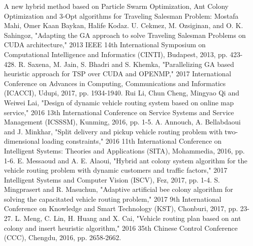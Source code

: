 \documentclass[conference]{IEEEtran}
\begin{document}
\begin{thebibliography}{00}
 A new hybrid method based on Particle Swarm Optimization, Ant Colony Optimization and 3-Opt algorithms for Traveling Salesman Problem: Mostafa Mahi, Omer Kaan Baykan, Halife Kodaz.
 U. Cekmez, M. Ozsiginan, and O. K. Sahingoz, "Adapting the GA approach to solve Traveling Salesman Problems on CUDA architecture," 2013 IEEE 14th International Symposium on Computational Intelligence and Informatics (CINTI), Budapest, 2013, pp. 423-428.
 R. Saxena, M. Jain, S. Bhadri and S. Khemka, "Parallelizing GA based heuristic approach for TSP over CUDA and OPENMP," 2017 International Conference on Advances in Computing, Communications and Informatics (ICACCI), Udupi, 2017, pp. 1934-1940.
 Rui Li, Chun Cheng, Mingyao Qi and Weiwei Lai, "Design of dynamic vehicle routing system based on online map service," 2016 13th International Conference on Service Systems and Service Management (ICSSSM), Kunming, 2016, pp. 1-5.
 A. Annouch, A. Bellabdaoui and J. Minkhar, "Split delivery and pickup vehicle routing problem with two-dimensional loading constraints," 2016 11th International Conference on Intelligent Systems: Theories and Applications (SITA), Mohammedia, 2016, pp. 1-6.
 E. Messaoud and A. E. Alaoui, "Hybrid ant colony system algorithm for the vehicle routing problem with dynamic customers and traffic factors," 2017 Intelligent Systems and Computer Vision (ISCV), Fez, 2017, pp. 1-4.
 S. Mingprasert and R. Masuchun, "Adaptive artificial bee colony algorithm for solving the capacitated vehicle routing problem," 2017 9th International Conference on Knowledge and Smart Technology (KST), Chonburi, 2017, pp. 23-27.
 L. Meng, C. Lin, H. Huang and X. Cai, "Vehicle routing plan based on ant colony and insert heuristic algorithm," 2016 35th Chinese Control Conference (CCC), Chengdu, 2016, pp. 2658-2662.

\end{thebibliography}
\end{document}

